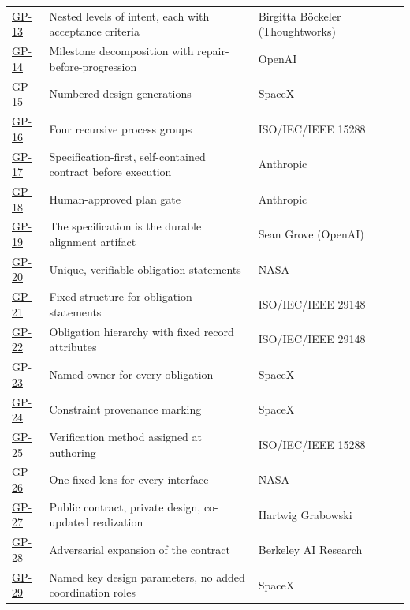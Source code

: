 \begin{longtable}{@{}l p{} p{} p{}@{}}
\hyperlink{gp-13}{GP-13} & Nested levels of intent, each with acceptance criteria & Birgitta B\"ockeler (Thoughtworks) & \citep{ps-bockeler-loops} \\
\hyperlink{gp-14}{GP-14} & Milestone decomposition with repair-before-progression & OpenAI & \citep{ps-openai-longhorizon} \\
\hyperlink{gp-15}{GP-15} & Numbered design generations & SpaceX & \citep{ps-sesnic-raptor} \\
\hyperlink{gp-16}{GP-16} & Four recursive process groups & ISO/IEC/IEEE 15288 & \citep{ps-jama-15288} \\
\hyperlink{gp-17}{GP-17} & Specification-first, self-contained contract before execution & Anthropic & \citep{ps-anthropic-bestpractices} \\
\hyperlink{gp-18}{GP-18} & Human-approved plan gate & Anthropic & \citep{ps-anthropic-bestpractices} \\
\hyperlink{gp-19}{GP-19} & The specification is the durable alignment artifact & Sean Grove (OpenAI) & \citep{ps-grove-newcode} \\
\hyperlink{gp-20}{GP-20} & Unique, verifiable obligation statements & NASA & \citep{ps-nasa-npr7123} \\
\hyperlink{gp-21}{GP-21} & Fixed structure for obligation statements & ISO/IEC/IEEE 29148 & \citep{ps-ieee-29148} \\
\hyperlink{gp-22}{GP-22} & Obligation hierarchy with fixed record attributes & ISO/IEC/IEEE 29148 & \citep{ps-reqview-29148,ps-iso-29148} \\
\hyperlink{gp-23}{GP-23} & Named owner for every obligation & SpaceX & \citep{ps-sesnic-starbase} \\
\hyperlink{gp-24}{GP-24} & Constraint provenance marking & SpaceX & \citep{ps-singh-fivetips} \\
\hyperlink{gp-25}{GP-25} & Verification method assigned at authoring & ISO/IEC/IEEE 15288 & \citep{ps-jama-15288} \\
\hyperlink{gp-26}{GP-26} & One fixed lens for every interface & NASA & \citep{ps-nasa-seh-appl} \\
\hyperlink{gp-27}{GP-27} & Public contract, private design, co-updated realization & Hartwig Grabowski & \citep{ps-grabowski-specgrowth} \\
\hyperlink{gp-28}{GP-28} & Adversarial expansion of the contract & Berkeley AI Research & \citep{ps-parameswaran-bair} \\
\hyperlink{gp-29}{GP-29} & Named key design parameters, no added coordination roles & SpaceX & \citep{ps-altium-spacex} \\

\end{longtable}

